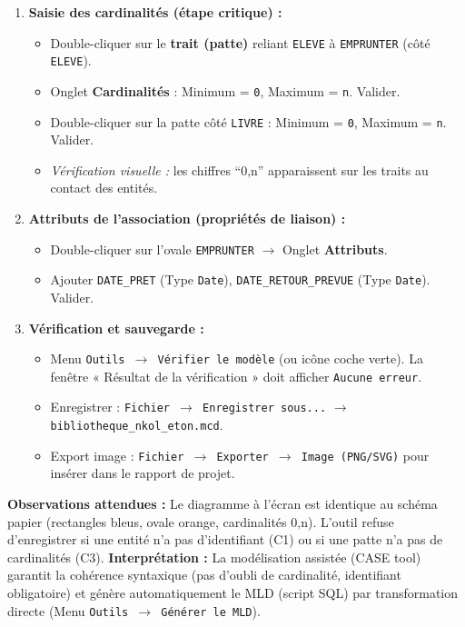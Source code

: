 \documentclass[11pt]{article}
\begin{document}
\begin{experience}
\begin{methode}
\begin{enumerate}
\begin{itemize}
  \end{itemize}
  \item \textbf{Saisie des cardinalités (étape critique) :}
  \begin{itemize}
    \item Double-cliquer sur le \textbf{trait (patte)} reliant \texttt{ELEVE} à \texttt{EMPRUNTER} (côté \texttt{ELEVE}).
    \item Onglet \textbf{Cardinalités} : Minimum = \texttt{0}, Maximum = \texttt{n}. Valider.
    \item Double-cliquer sur la patte côté \texttt{LIVRE} : Minimum = \texttt{0}, Maximum = \texttt{n}. Valider.
    \item \emph{Vérification visuelle :} les chiffres ``0,n'' apparaissent sur les traits au contact des entités.
  \end{itemize}
  \item \textbf{Attributs de l'association (propriétés de liaison) :}
  \begin{itemize}
    \item Double-cliquer sur l'ovale \texttt{EMPRUNTER} $\rightarrow$ Onglet \textbf{Attributs}.
    \item Ajouter \texttt{DATE\_PRET} (Type \texttt{Date}), \texttt{DATE\_RETOUR\_PREVUE} (Type \texttt{Date}). Valider.
  \end{itemize}
  \item \textbf{Vérification et sauvegarde :}
  \begin{itemize}
    \item Menu \texttt{Outils $\rightarrow$ Vérifier le modèle} (ou icône coche verte). La fenêtre « Résultat de la vérification » doit afficher \texttt{Aucune erreur}.
    \item Enregistrer : \texttt{Fichier $\rightarrow$ Enregistrer sous...} $\rightarrow$ \texttt{bibliotheque\_nkol\_eton.mcd}.
    \item Export image : \texttt{Fichier $\rightarrow$ Exporter $\rightarrow$ Image (PNG/SVG)} pour insérer dans le rapport de projet.
  \end{itemize}
\end{enumerate}
\end{methode}

\textbf{Observations attendues :} Le diagramme à l'écran est identique au schéma papier (rectangles bleus, ovale orange, cardinalités 0,n). L'outil refuse d'enregistrer si une entité n'a pas d'identifiant (C1) ou si une patte n'a pas de cardinalités (C3).
\textbf{Interprétation :} La modélisation assistée (CASE tool) garantit la cohérence syntaxique (pas d'oubli de cardinalité, identifiant obligatoire) et génère automatiquement le MLD (script SQL) par transformation directe (Menu \texttt{Outils $\rightarrow$ Générer le MLD}).
\end{experience}
\end{document}
